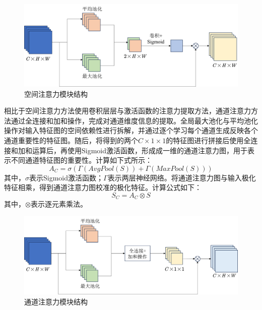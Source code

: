 \begin{figure}[ht!]
  \centering
  \includegraphics[width=14cm]{pic/chapter3/Spatial.png}
  \caption{空间注意力模块结构}
  \label{fig:spatial}
\end{figure}

相比于空间注意力方法使用卷积层层与激活函数的注意力提取方法，通道注意力方法通过全连接和加和操作，完成对通道维度信息的提取。全局最大池化与平均池化操作对输入特征图的空间依赖性进行拆解，并通过逐个学习每个通道生成反映各个通道重要性的特征图。随后，将得到的两个$C\times 1 \times 1$的特征图进行拼接后使用全连接和加和运算后，再使用Sigmoid激活函数，形成成一维的通道注意力图，用于表示不同通道特征图的重要性。计算如下式所示：
\begin{equation}
  A_C=\sigma(\Gamma(AvgPool(S))+\Gamma(MaxPool(S)))
\end{equation}
其中，$\sigma$表示Sigmoid激活函数；$\Gamma$表示两层神经网络。将通道注意力图与输入极化特征相乘，得到通道注意力图校准的极化特征。计算公式如下：
\begin{equation}
  S_C=A_C \otimes S
\end{equation}
其中，$\otimes$表示逐元素乘法。

\begin{figure}[ht!]
  \centering
  \includegraphics[width=14cm]{pic/chapter3/Channel.png}
  \caption{通道注意力模块结构}
  \label{fig:channel}
\end{figure}



